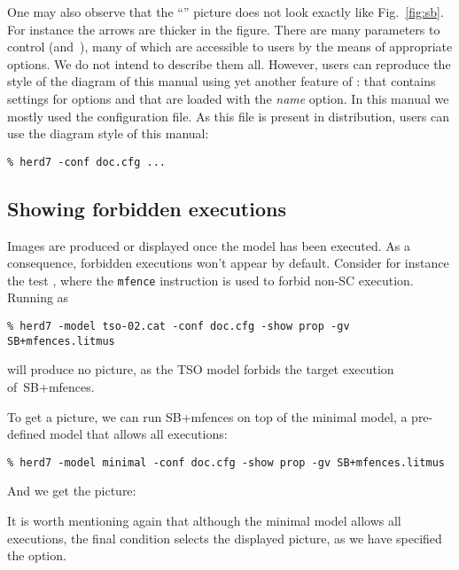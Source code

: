 One may also observe that the ``''  picture does not
look exactly like Fig.~\ref{fig:sb}. For instance the
 arrows are thicker in the figure.
There are many parameters to control  (and~),
many of which are accessible to \herd{} users by the means of appropriate
options. We do not intend to describe them all.
However, users can reproduce the style of the diagram of this manual using
yet another feature of \herd: 
that contains settings for \herd{} options and that are loaded with the
\textit{name} option.
In this manual we mostly used the  configuration file.
As this file is present in \herd{} distribution, users
can use the diagram style of this manual:
\begin{verbatim}
% herd7 -conf doc.cfg ...
\end{verbatim}

\subsection{\label{show:forbidden}Showing forbidden executions}
Images are produced or displayed once the model has been executed.
As a consequence,
forbidden executions won't appear by default.
Consider for instance the test ,
where the \texttt{mfence} instruction is used to forbid
 non-SC execution. Running \herd{} as
\begin{verbatim}
% herd7 -model tso-02.cat -conf doc.cfg -show prop -gv SB+mfences.litmus
\end{verbatim}
will produce no picture, as the TSO model forbids the target execution
of~\textsf{SB+mfences}.

To get a picture, we can run \textsf{SB+mfences} on top of the minimal
model, a pre-defined model that allows all executions:
\begin{verbatim}
% herd7 -model minimal -conf doc.cfg -show prop -gv SB+mfences.litmus
\end{verbatim}
And we get the picture:
\begin{center}\end{center}
It is worth mentioning again  that although the minimal model allows all
executions, the final condition
selects the displayed picture, as we have specified the
 option.


